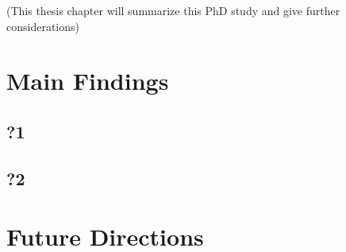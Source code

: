 (This thesis chapter will summarize this PhD study and give further
considerations)

\section{Main Findings}
\subsection{?1}
\subsection{?2}
\section{Future Directions}
